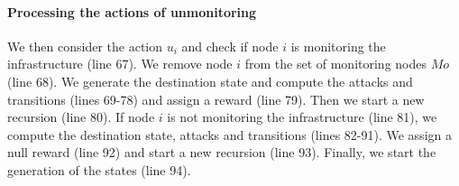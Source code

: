 \paragraph{Processing the actions of unmonitoring}
We then consider the action $u_i$ and check if node $i$ is monitoring the infrastructure (line 67). 
We remove node $i$ from the set of monitoring nodes $Mo$ (line 68).
We generate the destination state and compute the attacks and transitions (lines 69-78) and assign a reward (line 79).
Then we start a new recursion (line 80).
If node $i$ is not monitoring the infrastructure (line 81), we compute the destination state, attacks and transitions (lines 82-91).
We assign a null reward (line 92) and start a new recursion (line 93).
Finally, we start the generation of the states (line 94).

